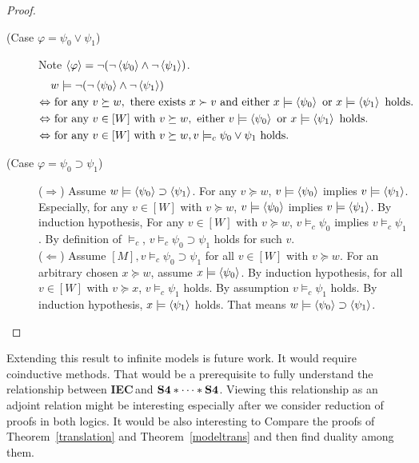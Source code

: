 \documentclass[doctor]{iscs-thesis}
\newcommand{\iec}{{\rm {\textbf{IEC}}}}
\newcommand{\ckv}{{\rm {\textbf{S4}\ast\cdots\ast\textbf{S4}}}}
\begin{document}
\begin{proof}
\begin{description}
  \item[ (Case $\varphi = \psi_0\vee\psi_1$)]
	     Note $\left\langle{\varphi}\right\rangle = \neg(\neg\left\langle{\psi_0}\right\rangle\wedge\neg\left\langle{\psi_1}\right\rangle)$.
	     \begin{align*}
	      &w\models \neg(\neg\left\langle{\psi_0}\right\rangle\wedge\neg\left\langle{\psi_1}\right\rangle)\\
	      \Leftrightarrow &\text{ for any }v\succeq w,
	      \text{ there exists }x\succ v
	      \text{ and either }
	      x\models \left\langle{\psi_0}\right\rangle
	      \text{ or }
	      x\models \left\langle{\psi_1}\right\rangle
	      \text{ holds.}\\
	      \Leftrightarrow&
	      \text{ for any }v\in[W]\text{ with }v\succeq w,
	      \text{ either }v\models \left\langle{\psi_0}\right\rangle\text{ or }
	      x\models \left\langle{\psi_1}\right\rangle
	      \text{ holds. }\\
	      \Leftrightarrow &
	      \text{ for any }v\in [W]\text{ with }v\succeq w,
	      v\models_c \psi_0\vee\psi_1\text{ holds. }
	     \end{align*}
  \item[ (Case $\varphi =\psi_0\supset\psi_1$)]
	     ($\Rightarrow$)
	     Assume $w\models \left\langle{\psi_0}\right\rangle\supset \left\langle{\psi_1}\right\rangle$.
	     For any $v\succeq w$,
	     $v\models\left\langle{\psi_0}\right\rangle$ implies
	     $v\models\left\langle{\psi_1}\right\rangle$.
	     Especially, for any $v\in [W]$ with $v\succeq w$,
	     $v\models\left\langle{\psi_0}\right\rangle$ implies
	     $v\models\left\langle{\psi_1}\right\rangle$.
	     By induction hypothesis,
	     For any $v\in [W]$ with $v\succeq w$,
	     $v\models_c \psi_0$ implies $v\models_c \psi_1$.
	     By definition of $\models_c$,
	     $v \models_c \psi_0\supset \psi_1$ holds
	     for such $v$. \\
	     ($\Leftarrow$)
	     Assume $[M], v\models_c \psi_0\supset \psi_1$ for all
	     $v\in [W]$ with $v\succeq w$.
	     For an arbitrary chosen $x\succeq w$,
	     assume $x\models \left\langle{\psi_0}\right\rangle$.
	     By induction hypothesis,
	     for all $v\in [W]$ with $v\succeq x$,
	     $v\models_c\psi_1$ holds.
	     By assumption $v\models_c\psi_1$ holds.
	     By induction hypothesis,
	     $x\models \left\langle{\psi_1}\right\rangle$ holds.
	     That means $w\models \left\langle{\psi_0}\right\rangle\supset \left\langle{\psi_1}\right\rangle$.
 \end{description}
\end{proof}

Extending this result to infinite models
is future work. It would require coinductive methods.
That would be a prerequisite to fully understand
the relationship between \iec\,and  $\ckv$.
Viewing this relationship as an adjoint relation
might be interesting especially after we consider reduction of proofs in both logics.
It would be also interesting to Compare the proofs of
Theorem~\ref{translation} and Theorem~\ref{modeltrans}
and then find duality among them.
\end{document}
